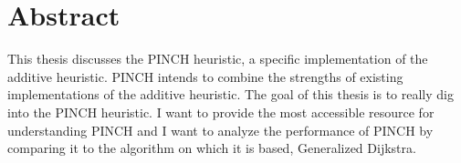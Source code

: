 \chapter{Abstract}
This thesis discusses the PINCH heuristic, a specific implementation of the additive heuristic. PINCH intends to combine the strengths of existing implementations of the additive heuristic. The goal of this thesis is to really dig into the PINCH heuristic. I want to provide the most accessible resource for understanding PINCH and I want to analyze the performance of PINCH by comparing it to the algorithm on which it is based, Generalized Dijkstra. 